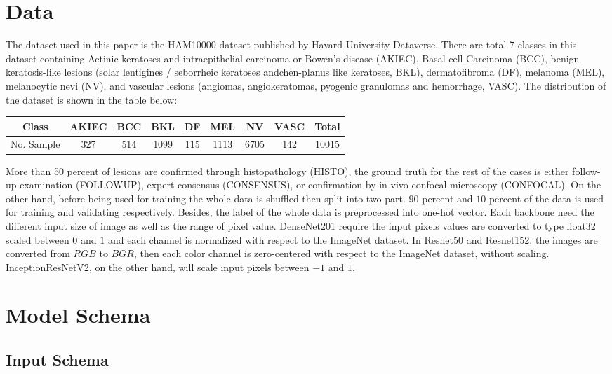 \section{Data}
The dataset used in this paper is the HAM10000 dataset published by Havard University Dataverse\cite{10417}. There are total 7 classes in this dataset containing Actinic keratoses and intraepithelial carcinoma or Bowen's disease (AKIEC), Basal cell Carcinoma (BCC),  benign keratosis-like lesions (solar lentigines / seborrheic keratoses andchen-planus like keratoses, BKL), dermatofibroma (DF), melanoma (MEL), melanocytic nevi (NV), and vascular lesions (angiomas, angiokeratomas, pyogenic granulomas and hemorrhage, VASC). The distribution of the dataset is shown in the table below:
\begin{center}
	\begin{tabular}{|c c c c c c c c c|} 
		\hline
		Class & AKIEC & BCC & BKL & DF & MEL & NV & VASC & Total \\ 
		\hline
		No. Sample & 327 & 514 & 1099 & 115 & 1113 & 6705 & 142 & 10015 \\
		\hline
	\end{tabular}
\end{center}
More than 50 percent of lesions are confirmed through histopathology (HISTO), the ground truth for the rest of the cases is either follow-up examination (FOLLOWUP), expert consensus (CONSENSUS), or confirmation by in-vivo confocal microscopy (CONFOCAL). On the other hand, before being used for training the whole data is shuffled then split into two part. $90$ percent and $10$ percent of the data is used for training and validating respectively. Besides, the label of the whole data is preprocessed into one-hot vector. Each backbone need the different input size of image as well as the range of pixel value. DenseNet201\cite{06993} require the input pixels values are converted to type float32 scaled between $0$ and $1$ and each channel is normalized with respect to the ImageNet dataset. In Resnet50 and Resnet152\cite{03385}\cite{05027}, the images are converted from $RGB$ to $BGR$, then each color channel is zero-centered with respect to the ImageNet dataset, without scaling. InceptionResNetV2\cite{11946}, on the other hand, will scale input pixels between $-1$ and $1$. 

\section{Model Schema}
\subsection{Input Schema}

